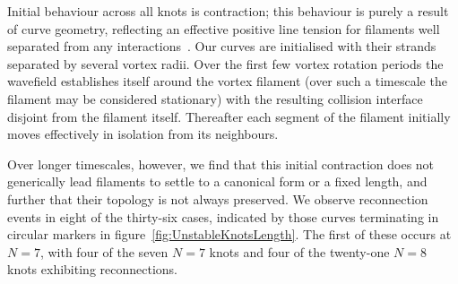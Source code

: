 Initial behaviour across all knots is contraction; this behaviour is purely a result of curve geometry, reflecting an effective positive line tension for filaments well separated from any interactions~\citep{Biktashev1994}. Our curves are initialised with their strands separated by several vortex radii. Over the first few vortex rotation periods the wavefield establishes itself around the vortex filament (over such a timescale the filament may be considered stationary) with the resulting collision interface disjoint from the filament itself. Thereafter each segment of the filament initially moves effectively in isolation from its neighbours. 

Over longer timescales, however, we find that this initial contraction does not generically lead filaments to settle to a canonical form or a fixed length, and further that their topology is not always preserved. We observe reconnection events in eight of the thirty-six cases, indicated by those curves terminating in circular markers in figure~\ref{fig:UnstableKnotsLength}. The first of these occurs at $N=7$, with four of the seven $N=7$ knots and four of the twenty-one $N=8$ knots exhibiting reconnections.

